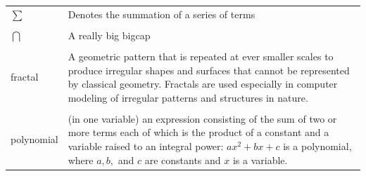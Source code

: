 \singlespacing
\begin{tabular}{l p{5in}} 


$\sum$ & Denotes the summation of a series of terms\\
\\%
$\bigcap$ & A really big bigcap\\
\\
fractal & A geometric pattern that is repeated at ever smaller
scales to produce irregular shapes and surfaces that cannot be represented by classical
geometry. Fractals are used especially in computer modeling of irregular patterns and structures in nature.\\
\\
polynomial & (in one variable) an expression consisting of the sum of two
or more terms each of which is the product of a constant and a
variable raised to an integral power: $ax^2 + bx + c$ is a
polynomial, where $a, b,$ and $c$ are constants and $x$ is a
variable.\\

\end{tabular}
\doublespacing
